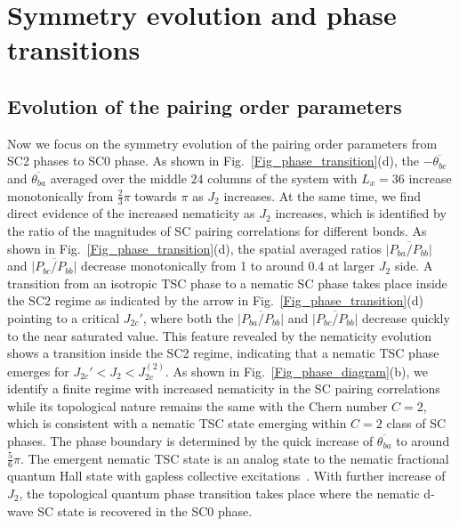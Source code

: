\documentclass[aps,prx,reprint,superscriptaddress,showpacs]{revtex4-2}
\newcommand{\oim}[1]{{\color{blue} #1}}
\begin{document}
\section{Symmetry evolution and phase transitions}
\label{symmetry_evolutions}

 \subsection{Evolution of the pairing order parameters}
 \label{pairing_order_evolution}
 
 \oim{Now we focus on the symmetry evolution of the pairing order parameters from SC2 phases to SC0 phase.
 As shown in Fig.~\ref{Fig_phase_transition}(d), the $-\overline{\theta _{bc }}$ and $\overline{\theta _{ba}}$
 averaged over the middle $24$ columns of the system with $L_{x}=36$
 increase monotonically from $\frac{2}{3}\pi $ towards $\pi$ as $J_{2}$ increases.
At the same time,  we find direct evidence of the increased nematicity as $J_{2}$  increases, which is identified by the ratio of the 
 magnitudes of SC pairing correlations  for different bonds. As shown in Fig.~\ref{Fig_phase_transition}(d), the spatial averaged ratios  $\overline{ \left |P_{ba} / P_{bb} \right| }$ and $ \overline{ \left |{P}_{bc} / {P}_{bb} \right |}$ decrease monotonically from 1 to around 0.4 at larger $J_{2}$  side.
 A transition from an isotropic TSC phase to a nematic SC phase takes place inside the SC2 regime as indicated by the arrow in  Fig.~\ref{Fig_phase_transition}(d) pointing to a critical $J_{2c}'$, where both the 
$\overline{ \left |P_{ba} / P_{bb} \right| }$ and $ \overline{ \left |{P}_{bc} / {P}_{bb} \right |}$
decrease quickly to the near saturated value. This feature revealed by the nematicity evolution shows a transition inside the SC2 regime, indicating that a nematic TSC phase emerges for $J_{2c}' < J_{2} <J_{2c}^{(2)}$.
As shown in Fig.~\ref{Fig_phase_diagram}(b), we identify a finite regime with increased nematicity in the SC pairing correlations while its topological nature remains the same with the Chern number $C=2$, which is consistent with  a nematic TSC state emerging within $C=2$ class of SC phases. The phase boundary is determined by the quick increase of $\overline{\theta _{ba}}$ to around $\frac{5}{6}\pi$. The emergent nematic TSC state is an analog state to the nematic fractional quantum Hall state with gapless collective excitations~\cite{haldane2011geometrical,you2014theory,yang2017anisotropic,regnault2017evidence}.} With further increase of $J_{2}$, the topological quantum phase transition takes place where the nematic d-wave SC state is recovered in  the SC0 phase.
\end{document}
